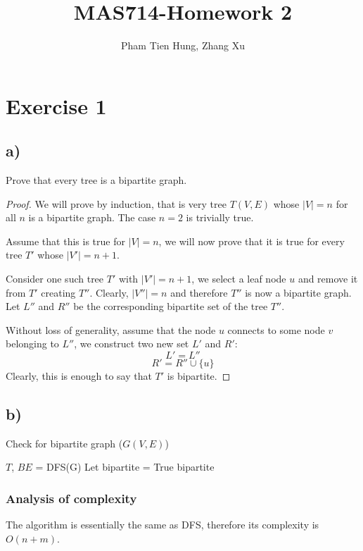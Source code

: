 \documentclass[a4paper,10pt,twoside]{article}
\title{MAS714-Homework 2}
\author{Pham Tien Hung, Zhang Xu
}
\date{}
\newtheorem{proof}{Proof}
\begin{document}
\maketitle
\listoftodos[Notes]

\section*{Exercise 1}
\subsection*{a)}
Prove that every tree is a bipartite graph.
\begin{proof}
	We will prove by induction, that is very tree $T(V, E)$ whose
	$|V| = n$ for all $n$ is a bipartite graph. The case $n=2$ is trivially true.

	Assume that this is true for $|V| = n$, we will now prove that it
	is true for every tree $T'$ whose $|V'| = n + 1$. 

	Consider one such tree $T'$ with $|V'| = n + 1$, we select a leaf node $u$
	and remove it from $T'$ creating $T''$. Clearly, $|V''| = n$ and
	therefore $T''$ is now a bipartite graph. Let $L''$ and $R''$ be the
	corresponding bipartite set of the tree $T''$.

	Without loss of generality, assume that the node $u$ connects to
	some node $v$ belonging to $L''$, we construct two new set $L'$
	and $R'$:
	\[
		L' = L''
	\]
	\[
		R' = R'' \cup \{u\}
	\]
	Clearly, this is enough to say that $T'$ is bipartite.	
\end{proof}

\subsection*{b)}
\begin{algorithm}[H]
	\caption{Check for bipartite graph ($G(V, E)$)}
	$T$, $BE$ = DFS(G) 
	Let bipartite = True\;
	\Return bipartite
\end{algorithm}
\subsubsection*{Analysis of complexity}
The algorithm is essentially the same as DFS, therefore its complexity is $O(n + m)$.
\end{document}

